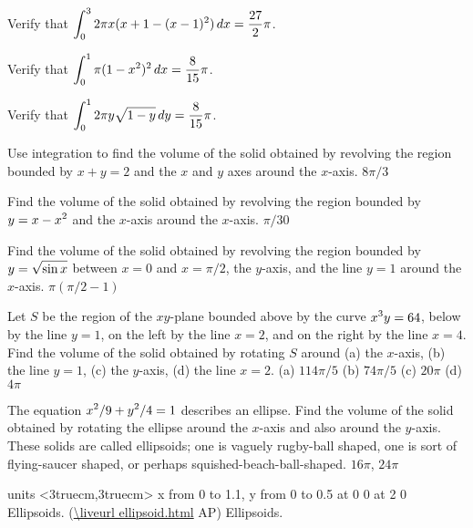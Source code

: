 \exercise Verify that $\displaystyle\int_0^3 2\pi x(x+1-(x-1)^2)\,dx={27\over2}\pi$.
\endexercise

\exercise Verify that $\displaystyle \int_0^1 \pi(1-x^2)^2\,dx={8\over15}\pi$.
\endexercise

\exercise Verify that $\displaystyle \int_0^1 2\pi y \sqrt{1-y}\,dy={8\over15}\pi$.
\endexercise

\exercise
Use integration to find the volume of the solid obtained by revolving 
the region bounded by $x+y=2$ and the $x$ and $y$ axes around the
$x$-axis. 
\answer $8\pi/3$
\endanswer
\endexercise

\exercise
Find the volume of the solid obtained by revolving 
the region bounded by $\displaystyle y=x-x^2$
and the $x$-axis around the
$x$-axis. 
\answer $\pi/30$
\endanswer
\endexercise

\exercise
Find the volume of the solid obtained by revolving 
the region bounded by $\displaystyle y=\sqrt{\sin x}$ between $x=0$ and
$x=\pi/2$, the $y$-axis, and the line
$y=1$ around the
$x$-axis. 
\answer $\pi(\pi/2-1)$
\endanswer
\endexercise

\exercise
Let $S$ be the region of the $xy$-plane bounded above by the curve
$\displaystyle x^3y=64$, below by the line $y=1$, on the left by  the line $x=2$, and
on the right by the line $x=4$.  Find
the volume of the solid obtained by rotating $S$ around (a) the $x$-axis,
(b) the line $y=1$, (c) the $y$-axis, (d) the line $x=2$.
\answer (a) $114\pi/5$ (b) $74\pi/5$ (c) $20\pi$\hfill\break
(d) $4\pi$
\endanswer
\endexercise

\exercise The equation $\displaystyle x^2/9+y^2/4=1$ describes an ellipse.  Find the
volume of the solid obtained by rotating the ellipse around the
$x$-axis and also around the $y$-axis. These solids are
called {\dfont ellipsoids\/}; one is vaguely rugby-ball shaped, one is
sort of flying-saucer shaped, or perhaps squished-beach-ball-shaped.
\answer $16\pi$, $24\pi$
\endanswer

\figure
\texonly
\vbox{\beginpicture
\normalgraphs
\ninepoint
\setcoordinatesystem units <3truecm,3truecm>
\setplotarea x from 0 to 1.1, y from 0 to 0.5
 at 0 0
 at 2 0
\endpicture}
\begincaption
{Ellipsoids.
(\expandafter\url\expandafter{\liveurl ellipsoid.html}%
AP\endurl)}
\endcaption
\endtexonly
{}
\htmlonly
\begincaption
Ellipsoids.
\endcaption
\endhtmlonly
\endfigure
\endexercise

